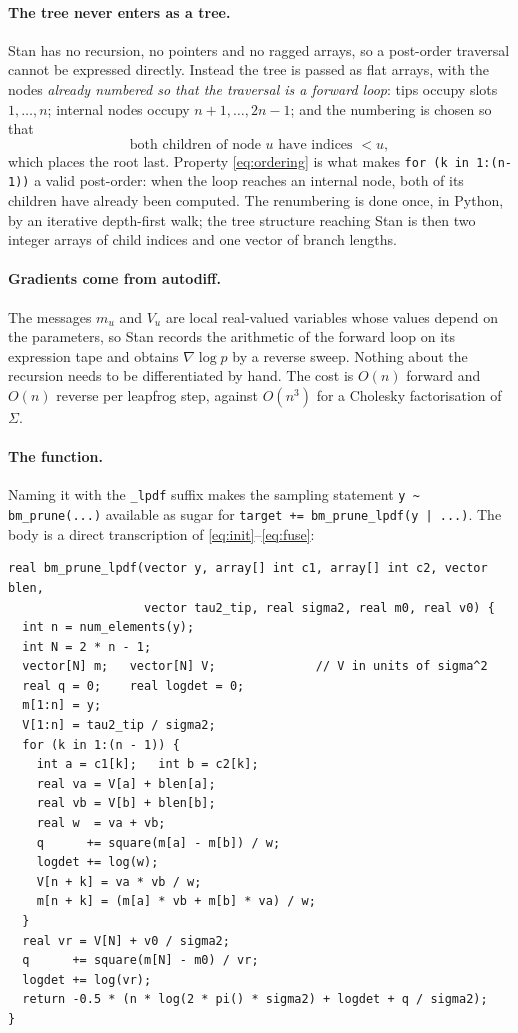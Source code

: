 \documentclass[11pt]{article}
\theoremstyle{remark}
\begin{document}
\paragraph{The tree never enters as a tree.} Stan has no recursion, no pointers and no ragged
arrays, so a post-order traversal cannot be expressed directly. Instead the tree is passed as
flat arrays, with the nodes \emph{already numbered so that the traversal is a forward loop}:
tips occupy slots $1,\dots,n$; internal nodes occupy $n{+}1,\dots,2n{-}1$; and the numbering
is chosen so that
\begin{equation}
  \text{both children of node } u \text{ have indices } < u ,
  \label{eq:ordering}
\end{equation}
which places the root last. Property \eqref{eq:ordering} is what makes
\texttt{for (k in 1:(n-1))} a valid post-order: when the loop reaches an internal node, both
of its children have already been computed. The renumbering is done once, in Python, by an
iterative depth-first walk; the tree structure reaching Stan is then two integer arrays of
child indices and one vector of branch lengths.

\paragraph{Gradients come from autodiff.} The messages $m_u$ and $V_u$ are local real-valued
variables whose values depend on the parameters, so Stan records the arithmetic of the forward
loop on its expression tape and obtains $\nabla \log p$ by a reverse sweep. Nothing about the
recursion needs to be differentiated by hand. The cost is $O(n)$ forward and $O(n)$ reverse per
leapfrog step, against $O(n^3)$ for a Cholesky factorisation of $\Sigma$.

\paragraph{The function.} Naming it with the \texttt{\_lpdf} suffix makes the sampling statement
\texttt{y \textasciitilde{} bm\_prune(...)} available as sugar for
\texttt{target += bm\_prune\_lpdf(y | ...)}. The body is a direct transcription of
\eqref{eq:init}--\eqref{eq:fuse}:

\begin{Verbatim}[fontsize=\small, xleftmargin=1em]
real bm_prune_lpdf(vector y, array[] int c1, array[] int c2, vector blen,
                   vector tau2_tip, real sigma2, real m0, real v0) {
  int n = num_elements(y);
  int N = 2 * n - 1;
  vector[N] m;   vector[N] V;              // V in units of sigma^2
  real q = 0;    real logdet = 0;
  m[1:n] = y;
  V[1:n] = tau2_tip / sigma2;
  for (k in 1:(n - 1)) {
    int a = c1[k];   int b = c2[k];
    real va = V[a] + blen[a];
    real vb = V[b] + blen[b];
    real w  = va + vb;
    q      += square(m[a] - m[b]) / w;
    logdet += log(w);
    V[n + k] = va * vb / w;
    m[n + k] = (m[a] * vb + m[b] * va) / w;
  }
  real vr = V[N] + v0 / sigma2;
  q      += square(m[N] - m0) / vr;
  logdet += log(vr);
  return -0.5 * (n * log(2 * pi() * sigma2) + logdet + q / sigma2);
}
\end{Verbatim}
\end{document}
